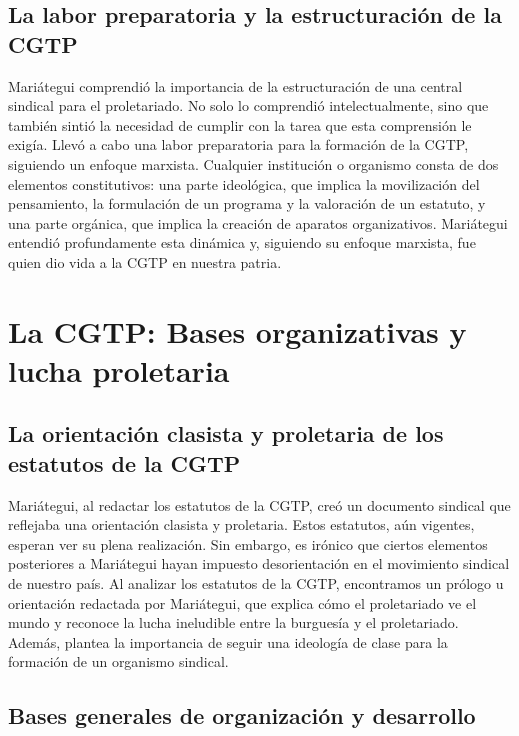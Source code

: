 \documentclass[
  jou,
  floatsintext,
  longtable,
  a4paper,
  nolmodern,
  notxfonts,
  notimes,
  12pt,
  colorlinks=true,linkcolor=blue,citecolor=blue,urlcolor=blue]{apa7}
\begin{document}
\subsection{La labor preparatoria y la estructuración de la
CGTP}\label{la-labor-preparatoria-y-la-estructuraciuxf3n-de-la-cgtp}

Mariátegui comprendió la importancia de la estructuración de una central
sindical para el proletariado. No solo lo comprendió intelectualmente,
sino que también sintió la necesidad de cumplir con la tarea que esta
comprensión le exigía. Llevó a cabo una labor preparatoria para la
formación de la CGTP, siguiendo un enfoque marxista. Cualquier
institución o organismo consta de dos elementos constitutivos: una parte
ideológica, que implica la movilización del pensamiento, la formulación
de un programa y la valoración de un estatuto, y una parte orgánica, que
implica la creación de aparatos organizativos. Mariátegui entendió
profundamente esta dinámica y, siguiendo su enfoque marxista, fue quien
dio vida a la CGTP en nuestra patria.

\section{La CGTP: Bases organizativas y lucha
proletaria}\label{la-cgtp-bases-organizativas-y-lucha-proletaria}

\subsection{La orientación clasista y proletaria de los estatutos de la
CGTP}\label{la-orientaciuxf3n-clasista-y-proletaria-de-los-estatutos-de-la-cgtp}

Mariátegui, al redactar los estatutos de la CGTP, creó un documento
sindical que reflejaba una orientación clasista y proletaria. Estos
estatutos, aún vigentes, esperan ver su plena realización. Sin embargo,
es irónico que ciertos elementos posteriores a Mariátegui hayan impuesto
desorientación en el movimiento sindical de nuestro país. Al analizar
los estatutos de la CGTP, encontramos un prólogo u orientación redactada
por Mariátegui, que explica cómo el proletariado ve el mundo y reconoce
la lucha ineludible entre la burguesía y el proletariado. Además,
plantea la importancia de seguir una ideología de clase para la
formación de un organismo sindical.

\subsection{Bases generales de organización y
desarrollo}\label{bases-generales-de-organizaciuxf3n-y-desarrollo}
\end{document}
